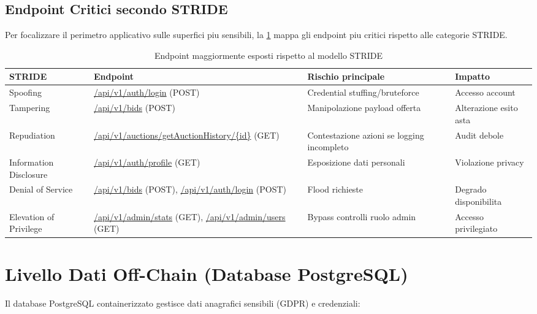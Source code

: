 \subsection*{Endpoint Critici secondo STRIDE}
Per focalizzare il perimetro applicativo sulle superfici piu sensibili, la \cref{tab:stride-endpoints} mappa gli endpoint piu critici rispetto alle categorie STRIDE.

\begin{table}[H]
    \centering
    \small
    \begin{tabular}{@{}p{}p{}p{}p{}@{}}
        \toprule
        \textbf{STRIDE} & \textbf{Endpoint} & \textbf{Rischio principale} & \textbf{Impatto} \\
        \midrule
        Spoofing & \url{/api/v1/auth/login} (POST) & Credential stuffing/bruteforce & Accesso account \\
        Tampering & \url{/api/v1/bids} (POST) & Manipolazione payload offerta & Alterazione esito asta \\
        Repudiation & \url{/api/v1/auctions/getAuctionHistory/\{id\}} (GET) & Contestazione azioni se logging incompleto & Audit debole \\
        Information Disclosure & \url{/api/v1/auth/profile} (GET) & Esposizione dati personali & Violazione privacy \\
        Denial of Service & \url{/api/v1/bids} (POST), \url{/api/v1/auth/login} (POST) & Flood richieste & Degrado disponibilita \\
        Elevation of Privilege & \url{/api/v1/admin/stats} (GET), \url{/api/v1/admin/users} (GET) & Bypass controlli ruolo admin & Accesso privilegiato \\
        \bottomrule
    \end{tabular}
    \caption{Endpoint maggiormente esposti rispetto al modello STRIDE}
    \label{tab:stride-endpoints}
\end{table}

\section{Livello Dati Off-Chain (Database PostgreSQL)}
Il database PostgreSQL containerizzato gestisce dati anagrafici sensibili (GDPR) e credenziali:

